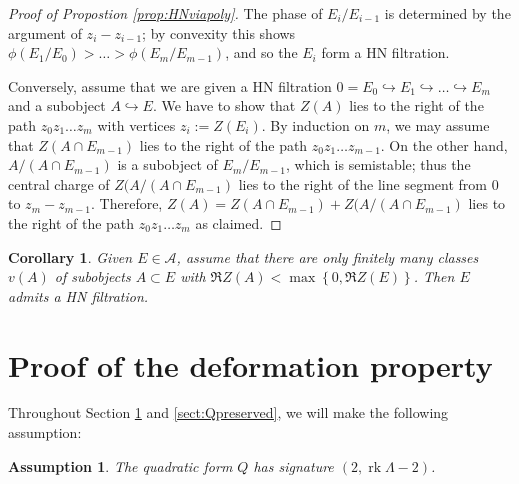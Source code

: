 \documentclass[leqno,11pt,twoside]{amsart}
\makeatletter
\newtheorem*{rep@theorem}{{Conjecture} \ref##}
\newtheorem{Cor}[Thm]{Corollary}
{\newenvironment{rep{Cor}}[1]{ } \begin{rep@theorem}} \end{rep@theorem}}
\newtheorem{Ass}[Thm]{Assumption}
\theoremstyle{definition}
\makeatother
\begin{document}
\begin{proof}[Proof of Propostion \ref{prop:HNviapoly}]
The phase of $E_i/E_{i-1}$ is determined by the argument of $z_i - z_{i-1}$;
by convexity this shows $\phi(E_1/E_0) > \dots > \phi(E_m/E_{m-1})$, and so the
$E_i$ form a HN filtration.

Conversely, assume that we are given a HN filtration $0 = E_0 {\ensuremath{\hookrightarrow}} E_1 {\ensuremath{\hookrightarrow}} \dots {\ensuremath{\hookrightarrow}} E_m$
and a subobject $A {\ensuremath{\hookrightarrow}} E$.
We have to show that $Z(A)$ lies to the right of the 
path $z_0z_1 \dots z_m$ with vertices $z_i := Z(E_i)$. By induction on $m$, we may 
assume that $Z(A \cap E_{m-1})$ lies to the right of the path $z_0z_1 \dots z_{m-1}$. On the other hand,
$A/\left(A \cap E_{m-1}\right)$ is a subobject of $E_m/E_{m-1}$, which is semistable; thus the central charge
of $Z(A/\left(A \cap E_{m-1}\right)$ lies to the right of the line segment from $0$ to $z_m - z_{m-1}$. 
Therefore, $Z(A) = Z(A \cap E_{m-1}) + Z(A/\left(A \cap E_{m-1}\right)$ lies to the right of the path
$z_0z_1\dots z_m$ as claimed.
\end{proof}

\begin{Cor} \label{cor:HNfromfinite}
Given $E \in {\ensuremath{\mathcal A}}$, assume that there are only finitely many classes
$v(A)$ of subobjects $A \subset E$ with $\Re Z(A) < \max \left\{0, \Re Z(E) \right\}$. Then $E$ admits a HN filtration.
\end{Cor}

\section{Proof of the deformation property}
\label{sect:proof}

Throughout Section \ref{sect:proof} and \ref{sect:Qpreserved}, we will make the following assumption:
\begin{Ass} \label{ass:nondeg}
The quadratic form $Q$ has signature $(2, {\mathop{\mathrm{rk}}} \Lambda - 2)$. 
\end{Ass}
\end{document}
